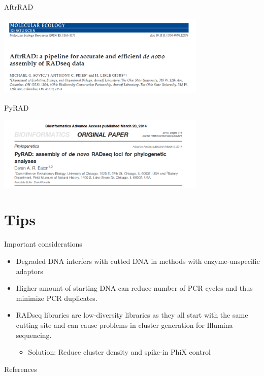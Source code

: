 \documentclass[presentation]{beamer}
\begin{document}
\begin{frame}[label=sec-4-1-9]{AftrRAD}
\begin{center}

\includegraphics[width=10cm]{AftrRAD.png}

\end{center}
\end{frame}

\begin{frame}[label=sec-4-1-10]{PyRAD}
\begin{center}

\includegraphics[width=10cm]{PyRAD.png}

\end{center}
\end{frame}
\section{Tips}
\label{sec-5}
\begin{frame}[label=sec-5-0-1]{Important considerations}
\begin{itemize}
\item Degraded DNA interfers with cutted DNA in methods with enzyme-unspecific adaptors
\item Higher amount of starting DNA can reduce number of PCR cycles and
thus minimize PCR duplicates.
\item RADseq libraries are low-diversity libraries as they all start with
the same cutting site and can cause problems in cluster generation
for Illumina sequencing.
\begin{itemize}
\item Solution: Reduce cluster density and spike-in PhiX control
\end{itemize}
\end{itemize}
\end{frame}
\begin{frame}[label=sec-5-0-2]{References}
\raggedright
\printbibliography[sorting=nty,heading=bibnumbered]
\end{frame}
\end{document}
